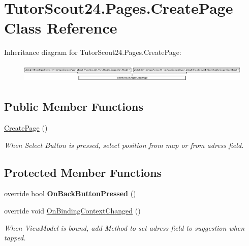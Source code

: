 \hypertarget{class_tutor_scout24_1_1_pages_1_1_create_page}{}\section{Tutor\+Scout24.\+Pages.\+Create\+Page Class Reference}
\label{class_tutor_scout24_1_1_pages_1_1_create_page}
Inheritance diagram for Tutor\+Scout24.\+Pages.\+Create\+Page\+:\begin{figure}[H]
\begin{center}
\leavevmode
\includegraphics[height=0.906149cm]{class_tutor_scout24_1_1_pages_1_1_create_page}
\end{center}
\end{figure}
\subsection*{Public Member Functions}
\begin{DoxyCompactItemize}
\item 
\mbox{\hyperlink{class_tutor_scout24_1_1_pages_1_1_create_page_aa64fe5937ca79ba707dac9503ca26935}{Create\+Page}} ()
\begin{DoxyCompactList}\small\item\em When Select Button is pressed, select position from map or from adress field. \end{DoxyCompactList}\end{DoxyCompactItemize}
\subsection*{Protected Member Functions}
\begin{DoxyCompactItemize}
\item 
\mbox{\label{class_tutor_scout24_1_1_pages_1_1_create_page_a2f2f8aef9aad7a67b2b3cfc73aeccde7}} 
override bool {\bfseries On\+Back\+Button\+Pressed} ()
\item 
override void \mbox{\hyperlink{class_tutor_scout24_1_1_pages_1_1_create_page_a0ce7b1aa53bf805acc40462094978ec9}{On\+Binding\+Context\+Changed}} ()
\begin{DoxyCompactList}\small\item\em When View\+Model is bound, add Method to set adress field to suggestion when tapped. \end{DoxyCompactList}\end{DoxyCompactItemize}


